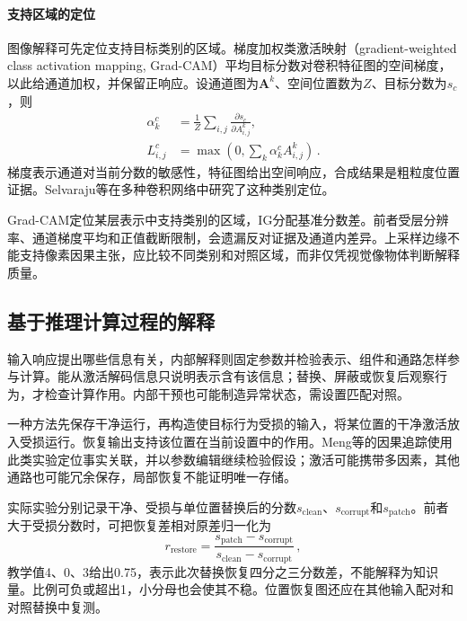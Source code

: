 \paragraph{支持区域的定位}

图像解释可先定位支持目标类别的区域。梯度加权类激活映射（gradient-weighted class activation mapping, Grad-CAM）平均目标分数对卷积特征图的空间梯度，以此给通道加权，并保留正响应。设通道图为$\bm A^k$、空间位置数为$Z$、目标分数为$s_c$，则
\begin{equation}
 \begin{aligned}
 \alpha_k^c&=\frac{1}{Z}\sum_{i,j}
 \frac{\partial s_c}{\partial A^k_{i,j}},\\
 L^c_{i,j}&=\max\!\left(0,\sum_k\alpha_k^c A^k_{i,j}\right)\, .
 \end{aligned}
 \label{eq:interpretability-gradcam}
\end{equation}
梯度表示通道对当前分数的敏感性，特征图给出空间响应，合成结果是粗粒度位置证据。Selvaraju等在多种卷积网络中研究了这种类别定位。

Grad-CAM定位某层表示中支持类别的区域，IG分配基准分数差。前者受层分辨率、通道梯度平均和正值截断限制，会遗漏反对证据及通道内差异。上采样边缘不能支持像素因果主张，应比较不同类别和对照区域，而非仅凭视觉像物体判断解释质量。

\subsection{基于推理计算过程的解释}
\label{sec:interpretability-local-mechanism}

输入响应提出哪些信息有关，内部解释则固定参数并检验表示、组件和通路怎样参与计算。能从激活解码信息只说明表示含有该信息；替换、屏蔽或恢复后观察行为，才检查计算作用。内部干预也可能制造异常状态，需设置匹配对照。

一种方法先保存干净运行，再构造使目标行为受损的输入，将某位置的干净激活放入受损运行。恢复输出支持该位置在当前设置中的作用。Meng等的因果追踪使用此类实验定位事实关联，并以参数编辑继续检验假设；激活可能携带多因素，其他通路也可能冗余保存，局部恢复不能证明唯一存储。

实际实验分别记录干净、受损与单位置替换后的分数$s_{\mathrm{clean}}$、$s_{\mathrm{corrupt}}$和$s_{\mathrm{patch}}$。前者大于受损分数时，可把恢复差相对原差归一化为
\begin{equation}
 r_{\mathrm{restore}}
 =\frac{s_{\mathrm{patch}}-s_{\mathrm{corrupt}}}
        {s_{\mathrm{clean}}-s_{\mathrm{corrupt}}}\, ,
 \label{eq:interpretability-restoration}
\end{equation}
教学值4、0、3给出0.75，表示此次替换恢复四分之三分数差，不能解释为知识量。比例可负或超出1，小分母也会使其不稳。位置恢复图还应在其他输入配对和对照替换中复测。

